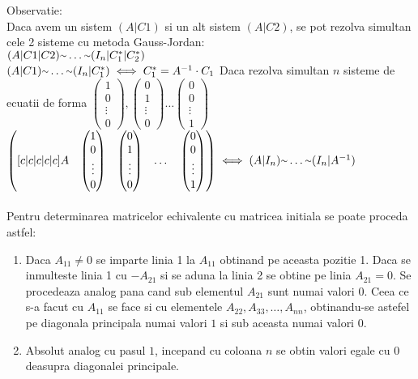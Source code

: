 \documentclass{article}
\newcommand{\mytilde}{\raise.17ex\hbox{$\scriptstyle\mathtt{\sim}$}}
\begin{document}
        Observatie:\\
        Daca avem un sistem $(A|C1)$ si un alt sistem $(A|C2)$, se pot rezolva simultan cele 2 sisteme cu metoda Gauss-Jordan:\\
        $(A|C1|C2)\mytilde \dots \mytilde (I_n|C_1^*|C_2^*)$\\
        $(A|C1) \mytilde \dots \mytilde (I_n|C_1^*) \iff C_1^* = A^{-1} \cdot C_1$
        Daca rezolva simultan $n$ sisteme de ecuatii de forma $\begin{pmatrix} 1\\0\\ \vdots\\ 0 \end{pmatrix}, \begin{pmatrix} 0\\1\\ \vdots\\ 0 \end{pmatrix}
            \dots \begin{pmatrix} 0\\0\\ \vdots\\ 1 \end{pmatrix}$\\
                $\begin{pmatrix}[c|c|c|c|c] A&\begin{pmatrix} 1\\0\\ \vdots\\ 0 \end{pmatrix}& \begin{pmatrix} 0\\1\\ \vdots\\ 0 \end{pmatrix}& \dots &
                    \begin{pmatrix}0\\0\\ \vdots\\ 1\end{pmatrix}\end{pmatrix} \iff (A|I_n) \mytilde \dots \mytilde (I_n|A^{-1})$ \\ \\
        Pentru determinarea matricelor echivalente cu matricea initiala se poate proceda astfel:
        \begin{enumerate}
            \item Daca $A_{11}\neq 0$ se imparte linia 1 la $A_{11}$ obtinand pe aceasta pozitie 1. Daca se inmulteste linia 1 cu $-A_{21}$ si se aduna la linia 2 se obtine pe linia $A_{21} = 0$. Se procedeaza analog pana cand sub elementul $A_{21}$ sunt numai valori $0$. Ceea ce s-a facut cu $A_{11}$ se face si cu elementele $A_{22}, A_{33}, \dots ,A_{nn}$, obtinandu-se astefel pe diagonala principala numai valori $1$ si sub aceasta numai valori $0$.
            \item Absolut analog cu pasul $1$, incepand cu coloana $n$ se obtin valori egale cu $0$ deasupra diagonalei principale.
        \end{enumerate}
\end{document}
